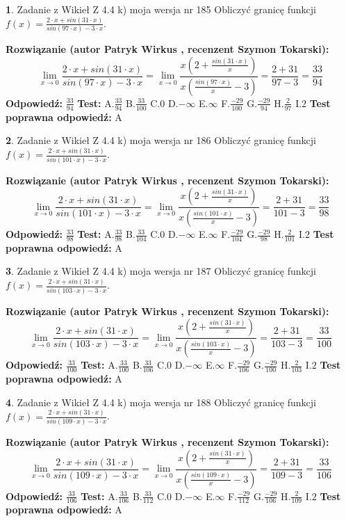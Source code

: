 \documentclass[12pt, a4paper]{article}
\theoremstyle{definition} %
\newtheorem{zad}{}
\newcommand{\zadStart}[1]{\begin{zad}#1\newline}
\newcommand{\zadStop}{\end{zad}}
\newcommand{\rozwStart}[2]{\noindent \textbf{Rozwiązanie (autor #1 , recenzent #2): }\newline}
\newcommand{\rozwStop}{\newline}
\newcommand{\odpStart}{\noindent \textbf{Odpowiedź:}\newline}
\newcommand{\odpStop}{\newline}
\newcommand{\testStart}{\noindent \textbf{Test:}\newline}
\newcommand{\testStop}{\newline}
\newcommand{\kluczStart}{\noindent \textbf{Test poprawna odpowiedź:}\newline}
\newcommand{\kluczStop}{\newline}
\begin{document}
\zadStart{Zadanie z Wikieł Z 4.4 k) moja wersja nr 185}
Obliczyć granicę funkcji $f(x)=\frac{2\cdot x +sin(31\cdot x)}{sin(97\cdot x) -3\cdot x}$.
\zadStop
\rozwStart{Patryk Wirkus}{Szymon Tokarski}
$$\lim\limits_{x\to 0}\frac{2\cdot x +sin(31\cdot x)}{sin(97\cdot x) -3\cdot x}
=\lim\limits_{x\to 0}\frac{x(2+\frac{sin(31\cdot x)}{x})}{x(\frac{sin(97\cdot x)}{x}-3)}
=\frac{2+31}{97-3} = \frac{33}{94}$$
\rozwStop
\odpStart
$\frac{33}{94}$
\odpStop
\testStart
A.$\frac{33}{94}$
B.$\frac{33}{100}$
C.$0$
D.$-\infty$
E.$\infty$
F.$\frac{-29}{100}$
G.$\frac{-29}{94}$
H.$\frac{2}{97}$
I.$2$
\testStop
\kluczStart
A
\kluczStop



\zadStart{Zadanie z Wikieł Z 4.4 k) moja wersja nr 186}
Obliczyć granicę funkcji $f(x)=\frac{2\cdot x +sin(31\cdot x)}{sin(101\cdot x) -3\cdot x}$.
\zadStop
\rozwStart{Patryk Wirkus}{Szymon Tokarski}
$$\lim\limits_{x\to 0}\frac{2\cdot x +sin(31\cdot x)}{sin(101\cdot x) -3\cdot x}
=\lim\limits_{x\to 0}\frac{x(2+\frac{sin(31\cdot x)}{x})}{x(\frac{sin(101\cdot x)}{x}-3)}
=\frac{2+31}{101-3} = \frac{33}{98}$$
\rozwStop
\odpStart
$\frac{33}{98}$
\odpStop
\testStart
A.$\frac{33}{98}$
B.$\frac{33}{104}$
C.$0$
D.$-\infty$
E.$\infty$
F.$\frac{-29}{104}$
G.$\frac{-29}{98}$
H.$\frac{2}{101}$
I.$2$
\testStop
\kluczStart
A
\kluczStop



\zadStart{Zadanie z Wikieł Z 4.4 k) moja wersja nr 187}
Obliczyć granicę funkcji $f(x)=\frac{2\cdot x +sin(31\cdot x)}{sin(103\cdot x) -3\cdot x}$.
\zadStop
\rozwStart{Patryk Wirkus}{Szymon Tokarski}
$$\lim\limits_{x\to 0}\frac{2\cdot x +sin(31\cdot x)}{sin(103\cdot x) -3\cdot x}
=\lim\limits_{x\to 0}\frac{x(2+\frac{sin(31\cdot x)}{x})}{x(\frac{sin(103\cdot x)}{x}-3)}
=\frac{2+31}{103-3} = \frac{33}{100}$$
\rozwStop
\odpStart
$\frac{33}{100}$
\odpStop
\testStart
A.$\frac{33}{100}$
B.$\frac{33}{106}$
C.$0$
D.$-\infty$
E.$\infty$
F.$\frac{-29}{106}$
G.$\frac{-29}{100}$
H.$\frac{2}{103}$
I.$2$
\testStop
\kluczStart
A
\kluczStop



\zadStart{Zadanie z Wikieł Z 4.4 k) moja wersja nr 188}
Obliczyć granicę funkcji $f(x)=\frac{2\cdot x +sin(31\cdot x)}{sin(109\cdot x) -3\cdot x}$.
\zadStop
\rozwStart{Patryk Wirkus}{Szymon Tokarski}
$$\lim\limits_{x\to 0}\frac{2\cdot x +sin(31\cdot x)}{sin(109\cdot x) -3\cdot x}
=\lim\limits_{x\to 0}\frac{x(2+\frac{sin(31\cdot x)}{x})}{x(\frac{sin(109\cdot x)}{x}-3)}
=\frac{2+31}{109-3} = \frac{33}{106}$$
\rozwStop
\odpStart
$\frac{33}{106}$
\odpStop
\testStart
A.$\frac{33}{106}$
B.$\frac{33}{112}$
C.$0$
D.$-\infty$
E.$\infty$
F.$\frac{-29}{112}$
G.$\frac{-29}{106}$
H.$\frac{2}{109}$
I.$2$
\testStop
\kluczStart
A
\kluczStop
\end{document}
